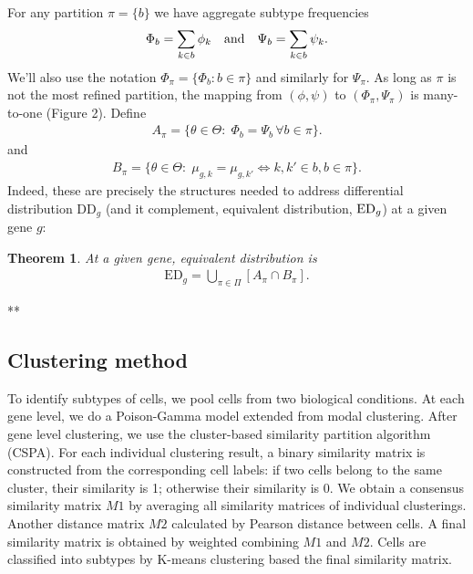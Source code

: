 \documentclass[11pt]{amsart}
\newtheorem{theorem}{Theorem}
\begin{document}
For any partition $\pi=\{b\}$ we have aggregate subtype frequencies
\begin{eqnarray*}
\Phi_b = \sum_{k\in b} \phi_k \quad {\mbox {\rm  and}} \quad 
 \Psi_b = \sum_{k\in b} \psi_k.
\end{eqnarray*}
We'll also use the notation $\Phi_\pi = \{ \Phi_b: b \in \pi \}$ and similarly
for $\Psi_\pi$.   As long as $\pi$ is not the most refined partition,
the mapping from $( \phi, \psi )$ to $( \Phi_\pi, \Psi_\pi)$ is many-to-one
(Figure 2).
Define
\begin{eqnarray*}
A_\pi = \{ \theta\in \Theta: \; \Phi_b = \Psi_b  \, \forall b \in \pi \}.
\end{eqnarray*}
and
\begin{eqnarray*}
B_\pi = \{ \theta \in \Theta: \; \mu_{g,k} = \mu_{g,k'} \iff k,k' \in b, b \in \pi \}.
\end{eqnarray*}
Indeed, these are precisely the
structures needed to address differential distribution DD$_g$ (and
it complement, equivalent distribution, ${\rm ED}_g$) at a given gene
$g$: 

\begin{theorem}  At a given gene, equivalent distribution is
\begin{eqnarray*}
\text{ED}_g = \bigcup_{\pi \in \Pi}\left[ A_\pi \cap B_\pi \right].
\end{eqnarray*}
\end{theorem}


**
\subsection{Clustering method}
To identify subtypes of cells, we pool cells from two biological conditions. At each gene level, we do a Poison-Gamma model extended from modal clustering\cite{ref:dahl}. After gene level clustering, we use the cluster-based similarity partition algorithm (CSPA\cite{ref:cspa}). For each individual clustering result, a binary similarity matrix is constructed from the corresponding cell labels: if two cells belong to the same cluster, their similarity is 1; otherwise their similarity is 0. We obtain a consensus similarity matrix $M1$ by averaging all similarity matrices of individual clusterings. Another distance matrix $M2$ calculated by Pearson distance between cells. A final similarity matrix is obtained by weighted combining $M1$ and $M2$. Cells are classified into subtypes by K-means clustering based the final similarity matrix.
\end{document}
